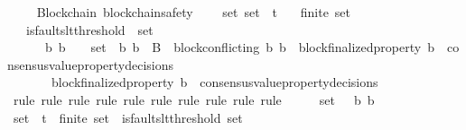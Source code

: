 \begin{isabellebody}
\ \ \isamarkupfalse%
\isanewline
{}\isamarkupfalse%
%
\endisatagproof
{\isafoldproof}%
%
\isadelimproof
\isanewline
%
\endisadelimproof
\isanewline
{}\isamarkupfalse%
\ {\isacharparenleft}\ Blockchain{\isacharparenright}\ blockchain{\isacharunderscore}safety\ {\isacharcolon}\isanewline
\ \ {\isachardoublequoteopen}{\isasymforall}\ {\isasymsigma}{\isacharunderscore}set{\isachardot}\ {\isasymsigma}{\isacharunderscore}set\ {\isasymsubseteq}\ {\isasymSigma}t\isanewline
\ \ {\isasymlongrightarrow}\ finite\ {\isasymsigma}{\isacharunderscore}set\isanewline
\ \ {\isasymlongrightarrow}\ is{\isacharunderscore}faults{\isacharunderscore}lt{\isacharunderscore}threshold\ {\isacharparenleft}{\isasymUnion}\ {\isasymsigma}{\isacharunderscore}set{\isacharparenright}\isanewline
\ \ {\isasymlongrightarrow}\ {\isacharparenleft}{\isasymforall}\ {\isasymsigma}\ {\isasymsigma}{\isacharprime}\ b{}\ b{}{\isachardot}\ {\isacharbraceleft}{\isasymsigma}{\isacharcomma}\ {\isasymsigma}{\isacharprime}{\isacharbraceright}\ {\isasymsubseteq}\ {\isasymsigma}{\isacharunderscore}set\ {\isasymand}\ {\isacharbraceleft}b{}{\isacharcomma}\ b{}{\isacharbraceright}\ {\isasymsubseteq}\ B\ {\isasymand}\ block{\isacharunderscore}conflicting\ {\isacharparenleft}b{}{\isacharcomma}\ b{}{\isacharparenright}\ {\isasymand}\ block{\isacharunderscore}finalized{\isacharunderscore}property\ b{}\ {\isasymin}\ consensus{\isacharunderscore}value{\isacharunderscore}property{\isacharunderscore}decisions\ {\isasymsigma}\ \isanewline
\ \ \ \ \ \ {\isasymlongrightarrow}\ block{\isacharunderscore}finalized{\isacharunderscore}property\ b{}\ {\isasymnotin}\ consensus{\isacharunderscore}value{\isacharunderscore}property{\isacharunderscore}decisions\ {\isasymsigma}{\isacharprime}{\isacharparenright}{\isachardoublequoteclose}\isanewline
%
\isadelimproof
\ \ %
\endisadelimproof
%
\isatagproof
{}\isamarkupfalse%
\ {\isacharparenleft}rule{\isacharcomma}\ rule{\isacharcomma}\ rule{\isacharcomma}\ rule{\isacharcomma}\ rule{\isacharcomma}\ rule{\isacharcomma}\ rule{\isacharcomma}\ rule{\isacharcomma}\ rule{\isacharcomma}\ rule{\isacharparenright}\isanewline
{}\isamarkupfalse%
\ {\isacharminus}\isanewline
\ \ \isamarkupfalse%
\ {\isasymsigma}{\isacharunderscore}set\ {\isasymsigma}\ {\isasymsigma}{\isacharprime}\ b{}\ b{}\isanewline
\ \ \ \isamarkupfalse%
\ {\isachardoublequoteopen}{\isasymsigma}{\isacharunderscore}set\ {\isasymsubseteq}\ {\isasymSigma}t{\isachardoublequoteclose}\ \ {\isachardoublequoteopen}finite\ {\isasymsigma}{\isacharunderscore}set{\isachardoublequoteclose}\ \ {\isachardoublequoteopen}is{\isacharunderscore}faults{\isacharunderscore}lt{\isacharunderscore}threshold\ {\isacharparenleft}{\isasymUnion}{\isasymsigma}{\isacharunderscore}set{\isacharparenright}{\isachardoublequoteclose}\ \isanewline

\end{isabellebody}
